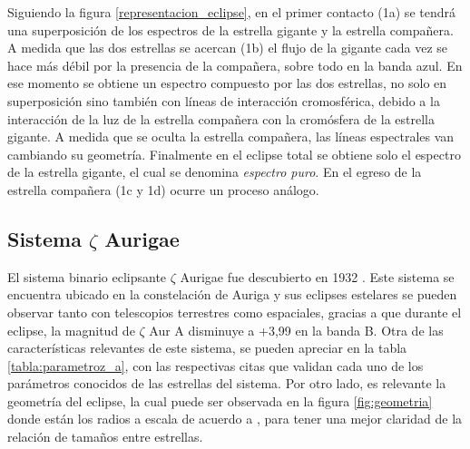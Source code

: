 \documentclass[12pt,oneside,openany,letter]{book}
\begin{document}
Siguiendo la figura \ref{representacion_eclipse}, en el primer contacto (1a) se tendrá una superposición de los espectros de la estrella gigante y la estrella compañera. A medida que las dos estrellas se acercan (1b) el flujo de la gigante cada vez se hace más débil por la presencia de la compañera, sobre todo en la banda azul. En ese momento se obtiene un espectro compuesto por las dos estrellas, no solo en superposición sino también con líneas de interacción cromosférica, debido a la interacción de la luz de la estrella compañera con la cromósfera de la estrella gigante. A medida que se oculta la estrella compañera, las líneas espectrales van cambiando su geometría. Finalmente en el eclipse total se obtiene solo el espectro de la estrella gigante, el cual se denomina \textit{espectro puro}. En el egreso de la estrella compañera (1c y 1d) ocurre un proceso análogo.

\subsection*{Sistema $\zeta$ Aurigae}\label{cap:zetaaur}

El sistema binario eclipsante $\zeta$ Aurigae fue descubierto en 1932 \citep{guthnick1934bevorstehende}. Este sistema se encuentra ubicado en la constelación de Auriga y sus eclipses estelares se pueden observar tanto con telescopios terrestres como espaciales, gracias a que durante el eclipse, la magnitud de $\zeta$ Aur A disminuye a +3,99 en la banda B. Otra de las características relevantes de este sistema, se pueden apreciar en la tabla \ref{tabla:parametroz_a}, con las respectivas citas que validan cada uno de los parámetros conocidos de las estrellas del sistema. Por otro lado, es relevante la geometría del eclipse, la cual puede ser observada en la figura \ref{fig:geometria} donde están los radios a escala de acuerdo a \citep{di1990angular}, para tener una mejor claridad de la relación de tamaños entre estrellas.

\end{document}
